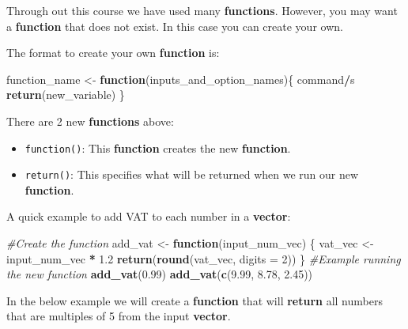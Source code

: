 \documentclass[]{book}
\newenvironment{Shaded}{\begin{snugshade}}{\end{snugshade}}
\newcommand{\KeywordTok}[1]{\textcolor[rgb]{0.13,0.29,0.53}{\textbf{#1}}}
\newcommand{\DataTypeTok}[1]{\textcolor[rgb]{0.13,0.29,0.53}{#1}}
\newcommand{\DecValTok}[1]{\textcolor[rgb]{0.00,0.00,0.81}{#1}}
\newcommand{\FloatTok}[1]{\textcolor[rgb]{0.00,0.00,0.81}{#1}}
\newcommand{\StringTok}[1]{\textcolor[rgb]{0.31,0.60,0.02}{#1}}
\newcommand{\CommentTok}[1]{\textcolor[rgb]{0.56,0.35,0.01}{\textit{#1}}}
\newcommand{\ControlFlowTok}[1]{\textcolor[rgb]{0.13,0.29,0.53}{\textbf{#1}}}
\newcommand{\OperatorTok}[1]{\textcolor[rgb]{0.81,0.36,0.00}{\textbf{#1}}}
\newcommand{\NormalTok}[1]{#1}
\providecommand{\tightlist}{%
  \setlength{\itemsep}{0pt}\setlength{\parskip}{0pt}}
\begin{document}
Through out this course we have used many \textbf{functions}. However,
you may want a \textbf{function} that does not exist. In this case you
can create your own.

The format to create your own \textbf{function} is:

\begin{Shaded}
\begin{Highlighting}[]
\NormalTok{function_name <-}\StringTok{ }\ControlFlowTok{function}\NormalTok{(inputs_and_option_names)\{}
\NormalTok{  command}\OperatorTok{/}\NormalTok{s}
  \KeywordTok{return}\NormalTok{(new_variable)}
\NormalTok{\}}
\end{Highlighting}
\end{Shaded}

There are 2 new \textbf{functions} above:

\begin{itemize}
\tightlist
\item
  \texttt{function()}: This \textbf{function} creates the new
  \textbf{function}.
\item
  \texttt{return()}: This specifies what will be returned when we run
  our new \textbf{function}.
\end{itemize}

A quick example to add VAT to each number in a \textbf{vector}:

\begin{Shaded}
\begin{Highlighting}[]
\CommentTok{#Create the function}
\NormalTok{add_vat <-}\StringTok{ }\ControlFlowTok{function}\NormalTok{(input_num_vec) \{}
\NormalTok{  vat_vec <-}\StringTok{ }\NormalTok{input_num_vec }\OperatorTok{*}\StringTok{ }\FloatTok{1.2}
  \KeywordTok{return}\NormalTok{(}\KeywordTok{round}\NormalTok{(vat_vec, }\DataTypeTok{digits =} \DecValTok{2}\NormalTok{))}
\NormalTok{\}}
\CommentTok{#Example running the new function}
\KeywordTok{add_vat}\NormalTok{(}\FloatTok{0.99}\NormalTok{)}
\KeywordTok{add_vat}\NormalTok{(}\KeywordTok{c}\NormalTok{(}\FloatTok{9.99}\NormalTok{, }\FloatTok{8.78}\NormalTok{, }\FloatTok{2.45}\NormalTok{))}
\end{Highlighting}
\end{Shaded}

In the below example we will create a \textbf{function} that will
\textbf{return} all numbers that are multiples of 5 from the input
\textbf{vector}.
\end{document}
